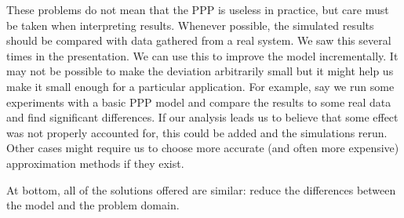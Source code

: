 \documentclass[]{article}
\begin{document}
These problems do not mean that the PPP is useless in practice, but care must be taken when interpreting results. Whenever possible, the simulated results should be compared with data gathered from a real system. We saw this several times in the presentation. We can use this to improve the model incrementally. It may not be possible to make the deviation arbitrarily small but it might help us make it small enough for a particular application. For example, say we run some experiments with a basic PPP model and compare the results to some real data and find significant differences. If our analysis leads us to believe that some effect was not properly accounted for, this could be added and the simulations rerun. Other cases might require us to choose more accurate (and often more expensive) approximation methods if they exist.

At bottom, all of the solutions offered are similar: reduce the differences between the model and the problem domain. 




 
\end{document}
